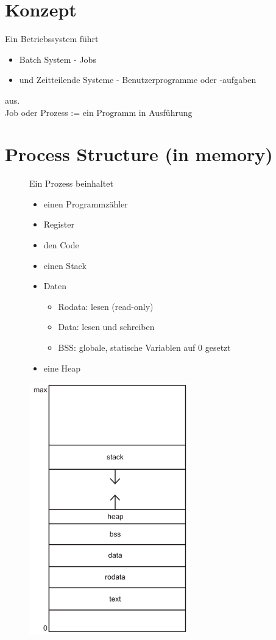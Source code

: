 \documentclass[a4paper]{scrreprt}
\begin{document}
\section{Konzept}
	Ein Betriebssystem führt
	\begin{itemize}
		\item Batch System - Jobs
		\item und Zeitteilende Systeme - Benutzerprogramme oder -aufgaben
	\end{itemize} 
	aus.\\
	Job oder Prozess := ein Programm in Ausführung
\section{Process Structure (in memory)}
	\begin{figure}[htbp]
		\begin{minipage}[t]{10cm}
			\vspace{0pt}
			Ein Prozess beinhaltet
			\begin{itemize}
				\item einen Programmzähler
				\item Register
				\item den Code
				\item einen Stack
				\item Daten
				\begin{itemize}
					\item Rodata: lesen (read-only)
					\item Data: lesen und schreiben
					\item BSS: globale, statische Variablen auf 0 gesetzt
				\end{itemize}
				\item eine Heap
			\end{itemize}
		\end{minipage}
		\hfill
		\begin{minipage}[t]{4cm}
			\vspace{0pt}
			\centering
			\includegraphics[scale = 0.3]{memory.png}\\
		\end{minipage}
	\end{figure}
\end{document}

